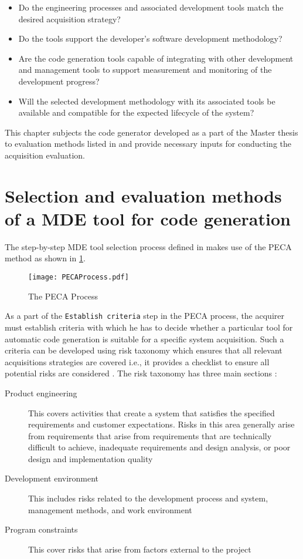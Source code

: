 \begin{itemize}
\item Do the engineering processes and associated development tools match the desired acquisition strategy?
\item Do the tools support the developer's software development methodology?
\item Are the code generation tools capable of integrating with other development and management tools to support measurement and monitoring of the development progress?
\item Will the selected development methodology with its associated tools be available and compatible for the expected lifecycle of the system? 
\end{itemize}

This chapter subjects the code generator developed as a part of the Master thesis to evaluation methods listed in \cite{EvalCodeGen} and provide necessary inputs for conducting the acquisition evaluation.

\section{Selection and evaluation methods of a MDE tool for code generation}
The step-by-step MDE tool selection process defined in \cite{EvalCodeGen} makes use of the PECA method \cite{PECAProcess} as shown in \cref{fig: PECA method}.  

\begin{figure}[h]
	\centering
	\texttt{[image: PECAProcess.pdf]}
	\caption{The PECA Process}
	\label{fig: PECA method}
\end{figure}

As a part of the \texttt{Establish criteria} step in the PECA process, the acquirer must establish criteria with which he has to decide whether a particular tool for automatic code generation is suitable for a specific system acquisition. Such a criteria can be developed using risk taxonomy \cite{RiskTax} which ensures that all relevant acquisitions strategies are covered i.e., it provides a checklist to ensure all potential risks are considered \cite{EvalCodeGen}. The risk taxonomy has three main sections \cite{RiskTax}:

\begin{description}
\item [Product engineering] This covers activities that create a system that satisfies the specified requirements and customer expectations. Risks in this area generally arise from requirements that arise from requirements that are technically difficult to achieve, inadequate requirements and design analysis, or poor design and implementation quality 
\item [Development environment] This includes risks related to the development process and system, management methods, and work environment
\item [Program constraints] This cover risks that arise from factors external to the project 
\end{description}

